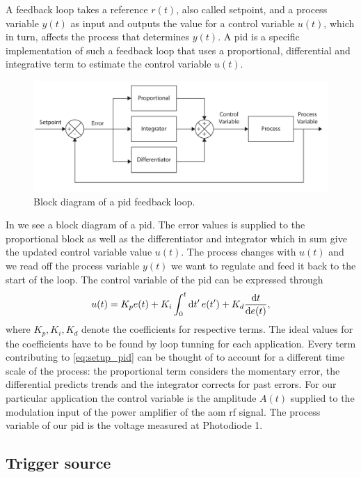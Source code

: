 A feedback loop takes a reference $r(t)$, also called setpoint, and a process
variable $y(t)$ as input and outputs the value for a control variable $u(t)$,
which in turn, affects the process that determines $y(t)$. A \gls{pid} is
a specific implementation of such a feedback loop that uses a proportional,
differential and integrative term to estimate the control variable $u(t)$.
\begin{figure}[htb]
  \centering
  \includegraphics[width=\textwidth]{../figure/setup/pid-controller.pdf}
  \caption{Block diagram of a \gls{pid} feedback loop.
  }\label{fig:setup_pid}
\end{figure}
In  we see a block diagram of a \gls{pid}. The error
values is supplied to the proportional block as well as the differentiator
and integrator which in sum give the updated control variable value $u(t)$.
The process changes with $u(t)$ and we read off the process variable $y(t)$
we want to regulate and feed it back to the start of the loop. The control
variable of the \gls{pid} can be expressed through
\begin{equation}
  u(t)
  =
  K_p e(t)+
  K_i \int_0^t \dd{t^\prime} e(t^\prime)+
  K_d \dv{t}{e(t)}
  \label{eq:setup_pid},
\end{equation}
where $K_p,K_i,K_d$ denote the coefficients for respective terms. The ideal
values for the coefficients have to be found by loop tunning for each
application. Every term contributing to \cref{eq:setup_pid} can be thought
of to account for a different time scale of the process: the proportional term
considers the momentary error, the differential predicts trends and the
integrator corrects for past errors. For our particular application the
control variable is the amplitude $A(t)$ supplied to the modulation input
of the power amplifier of the \gls{aom} \gls{rf} signal. The process variable
of our \gls{pid} is the voltage measured at Photodiode \num{1}.

\subsection{Trigger source}

